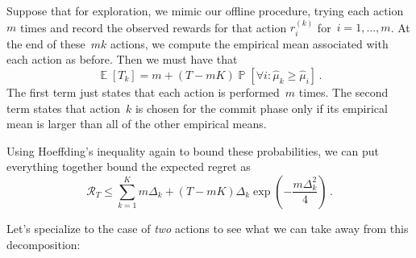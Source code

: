 \documentclass{tufte-book}
\begin{document}
Suppose that for exploration, we mimic our offline procedure, trying
each action~\(m\) times and record the observed rewards for that action
\(r_i^{(k)}\) for~\(i=1,\ldots,m\). At the end of these~\(mk\) actions,
we compute the empirical mean associated with each action as before.
Then we must have that \[
    \mathop\mathbb{E}[T_k] = m + (T-mK)\mathop\mathbb{P}[\forall i\colon \hat{\mu}_k \geq \hat{\mu}_i]\,.
\] The first term just states that each action is performed~\(m\) times.
The second term states that action~\(k\) is chosen for the commit phase
only if its empirical mean is larger than all of the other empirical
means.

Using Hoeffding's inequality again to bound these probabilities, we can
put everything together bound the expected regret as \[
 \mathcal{R}_T \leq \sum_{k=1}^K m\Delta_k + (T-mK) \Delta_k \exp\left(-\frac{m\Delta_k^2}{4}\right) \,.
\]

Let's specialize to the case of \emph{two} actions to see what we can
take away from this decomposition:
\end{document}
